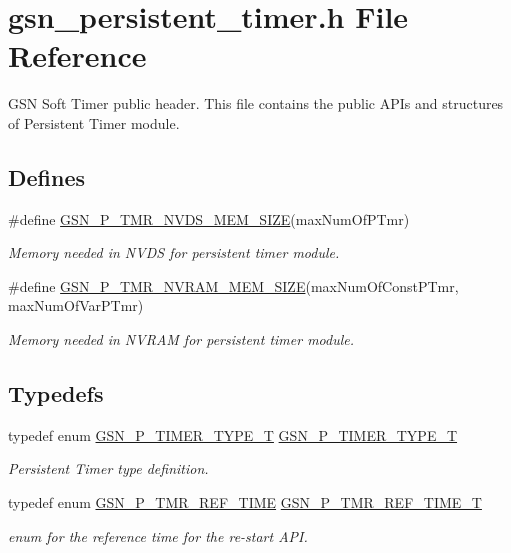\hypertarget{a00539}{
\section{gsn\_\-persistent\_\-timer.h File Reference}
\label{a00539}
}


GSN Soft Timer public header. This file contains the public APIs and structures of Persistent Timer module.  


\subsection*{Defines}
\begin{DoxyCompactItemize}
\item 
\#define \hyperlink{a00671_gaf983eb2e91bbb6a2e9a7d373419d69dd}{GSN\_\-P\_\-TMR\_\-NVDS\_\-MEM\_\-SIZE}(maxNumOfPTmr)
\begin{DoxyCompactList}\small\item\em Memory needed in NVDS for persistent timer module. \end{DoxyCompactList}\item 
\#define \hyperlink{a00671_ga814ac6b7dfd3d718d276b4794cb4b5d3}{GSN\_\-P\_\-TMR\_\-NVRAM\_\-MEM\_\-SIZE}(maxNumOfConstPTmr, maxNumOfVarPTmr)
\begin{DoxyCompactList}\small\item\em Memory needed in NVRAM for persistent timer module. \end{DoxyCompactList}\end{DoxyCompactItemize}
\subsection*{Typedefs}
\begin{DoxyCompactItemize}
\item 
typedef enum \hyperlink{a00671_gadc3540874fb3842b2eb56edd0c82945b}{GSN\_\-P\_\-TIMER\_\-TYPE\_\-T} \hyperlink{a00671_gad756dc4e5d1d8eb116b9daf7bddddb69}{GSN\_\-P\_\-TIMER\_\-TYPE\_\-T}
\begin{DoxyCompactList}\small\item\em Persistent Timer type definition. \end{DoxyCompactList}\item 
typedef enum \hyperlink{a00671_ga9aa5599a087c6080868052f86ecad7df}{GSN\_\-P\_\-TMR\_\-REF\_\-TIME} \hyperlink{a00671_ga8d27b193b47e23bf2bd68b439badf3d6}{GSN\_\-P\_\-TMR\_\-REF\_\-TIME\_\-T}
\begin{DoxyCompactList}\small\item\em enum for the reference time for the re-\/start API. \end{DoxyCompactList}\end{DoxyCompactItemize}

